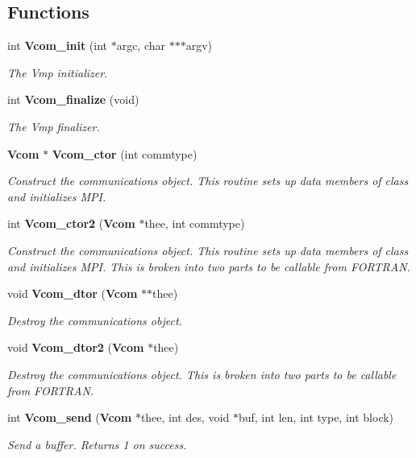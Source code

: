 \subsection*{Functions}
\begin{DoxyCompactItemize}
\item 
int {\bf Vcom\+\_\+init} (int $\ast$argc, char $\ast$$\ast$$\ast$argv)
\begin{DoxyCompactList}\small\item\em The Vmp initializer. \end{DoxyCompactList}\item 
int {\bf Vcom\+\_\+finalize} (void)
\begin{DoxyCompactList}\small\item\em The Vmp finalizer. \end{DoxyCompactList}\item 
{\bf Vcom} $\ast$ {\bf Vcom\+\_\+ctor} (int commtype)
\begin{DoxyCompactList}\small\item\em Construct the communications object. This routine sets up data members of class and initializes M\+P\+I. \end{DoxyCompactList}\item 
int {\bf Vcom\+\_\+ctor2} ({\bf Vcom} $\ast$thee, int commtype)
\begin{DoxyCompactList}\small\item\em Construct the communications object. This routine sets up data members of class and initializes M\+P\+I. This is broken into two parts to be callable from F\+O\+R\+T\+R\+A\+N. \end{DoxyCompactList}\item 
void {\bf Vcom\+\_\+dtor} ({\bf Vcom} $\ast$$\ast$thee)
\begin{DoxyCompactList}\small\item\em Destroy the communications object. \end{DoxyCompactList}\item 
void {\bf Vcom\+\_\+dtor2} ({\bf Vcom} $\ast$thee)
\begin{DoxyCompactList}\small\item\em Destroy the communications object. This is broken into two parts to be callable from F\+O\+R\+T\+R\+A\+N. \end{DoxyCompactList}\item 
int {\bf Vcom\+\_\+send} ({\bf Vcom} $\ast$thee, int des, void $\ast$buf, int len, int type, int block)
\begin{DoxyCompactList}\small\item\em Send a buffer. Returns 1 on success. \end{DoxyCompactList}\item 
$$
\end{DoxyCompactItemize}
